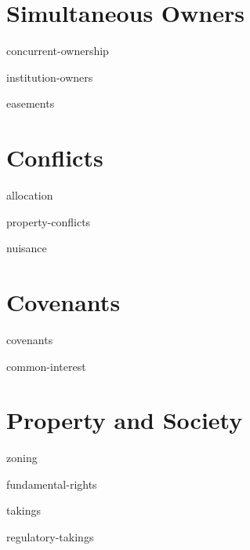 \documentclass[12pt]{book}
\begin{document}
\edmaterialfalse

\makevolume

\tableofcontents

\mainmatter


\part{Simultaneous Owners}

\module concurrent-ownership

\module institution-owners

\module easements



\part{Conflicts}

\module allocation

\module property-conflicts

\module nuisance




\part{Covenants}

\module covenants

\module common-interest





\part{Property and Society}

\module zoning

\module fundamental-rights

\module takings

\module regulatory-takings


\backmatter

\makeatletter
\def\indexname{Index of Key Terms}
\renewenvironment{theindex}
               {\if@twocolumn
                  \@restonecolfalse
                \else
                  \@restonecoltrue
                \fi
                \twocolumn[%
                    \@makechapterhead{\indexname}

                    This index covers key terms highlighted throughout the book.
                    It is not intended to be comprehensive, but may serve as a
                    useful study guide or test of your knowledge of property law
                    words and phrases.

                    \vskip\baselineskip
]%
                \@mkboth{\indexname}%
                        {\indexname}%
                \thispagestyle{plain}\parindent\z@
                \parskip\z@ \@plus .3\p@\relax
                \columnseprule \z@
                \columnsep 35\p@
                \let\item\@idxitem}
               {\if@restonecol\onecolumn\else\clearpage\fi}
\makeatother

\printindex
\end{document}
